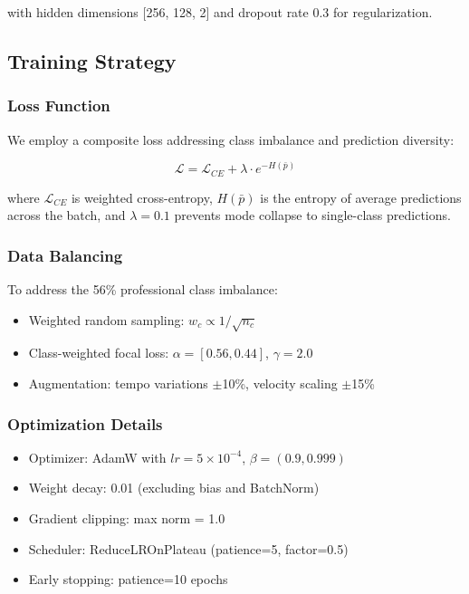 with hidden dimensions [256, 128, 2] and dropout rate 0.3 for regularization.

\subsection{Training Strategy}

\subsubsection{Loss Function}
We employ a composite loss addressing class imbalance and prediction diversity:

\begin{equation}
\mathcal{L} = \mathcal{L}_{CE} + \lambda \cdot e^{-H(\bar{p})}
\end{equation}

where $\mathcal{L}_{CE}$ is weighted cross-entropy, $H(\bar{p})$ is the entropy of average predictions across the batch, and $\lambda=0.1$ prevents mode collapse to single-class predictions.

\subsubsection{Data Balancing}
To address the 56\% professional class imbalance:
\begin{itemize}
\item Weighted random sampling: $w_c \propto 1/\sqrt{n_c}$
\item Class-weighted focal loss: $\alpha=[0.56, 0.44]$, $\gamma=2.0$
\item Augmentation: tempo variations $\pm$10\%, velocity scaling $\pm$15\%
\end{itemize}

\subsubsection{Optimization Details}
\begin{itemize}
\item Optimizer: AdamW with $lr=5 \times 10^{-4}$, $\beta=(0.9, 0.999)$
\item Weight decay: 0.01 (excluding bias and BatchNorm)
\item Gradient clipping: max norm = 1.0
\item Scheduler: ReduceLROnPlateau (patience=5, factor=0.5)
\item Early stopping: patience=10 epochs
\end{itemize}


